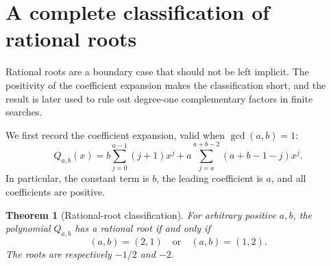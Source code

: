 \documentclass[11pt]{article}
\numberwithin{equation}{section}
\newtheorem{theorem}{Theorem}[section]
\theoremstyle{definition}
\begin{document}
\section{A complete classification of rational roots}
\label{sec:rational}

Rational roots are a boundary case that should not be left implicit.  The positivity of the coefficient expansion makes the classification short, and the result is later used to rule out degree-one complementary factors in finite searches.

We first record the coefficient expansion, valid when \(\gcd(a,b)=1\):
\begin{equation}
 Q_{a,b}(x)=
 b\sum_{j=0}^{a-1}(j+1)x^j
 +a\sum_{j=a}^{a+b-2}(a+b-1-j)x^j.
 \label{eq:10-1}
\end{equation}
In particular, the constant term is \(b\), the leading coefficient is \(a\),
and all coefficients are positive.

\begin{theorem}[Rational-root classification]\label{thm:rational}
For arbitrary positive \(a,b\), the polynomial \(Q_{a,b}\) has a rational root
if and only if
\[
 (a,b)=(2,1)\quad\text{or}\quad(a,b)=(1,2).
\]
The roots are respectively \(-1/2\) and \(-2\).
\end{theorem}
\end{document}
